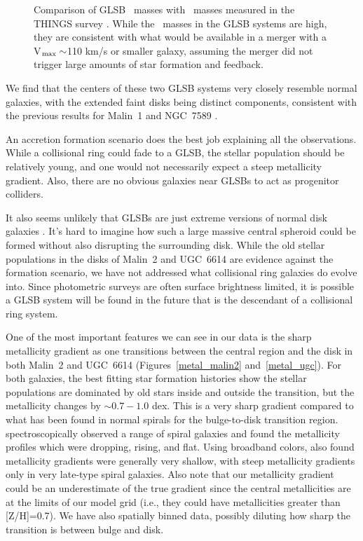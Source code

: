 \documentclass{emulateapj}
\newcommand\HI{\ion{H}{1}}
\begin{document}
\begin{figure*}
\caption{Comparison of GLSB \HI\ masses \citep{Pickering97} with \HI\ masses measured in the THINGS survey \citep{Walter2008}.  While the \HI\ masses in the GLSB systems are high, they are consistent with what would be available in a merger with a V$_{\rm{max}}\sim$110 km/s or smaller galaxy, assuming the merger did not trigger large amounts of star formation and feedback. \label{thingsMHI}}
\end{figure*}


We find that the centers of these two GLSB systems very closely resemble normal galaxies, with the extended faint disks being distinct components, consistent with the previous results for Malin~1 \citep{Barth07} and NGC~7589 \citep{Lelli10}. 

An accretion formation scenario does the best job explaining all the observations.  While a collisional ring could fade to a GLSB, the stellar population should be relatively young, and one would not necessarily expect a steep metallicity gradient.  Also, there are no obvious galaxies near GLSBs to act as progenitor colliders.  

It also seems unlikely that GLSBs are just extreme versions of normal disk galaxies \citep{Das13}.  It's hard to imagine how such a large massive central spheroid could be formed without also disrupting the surrounding disk.  While the old stellar populations in the disks of Malin~2 and UGC~6614 are evidence against the \citet{Mapelli08} formation scenario, we have not addressed what collisional ring galaxies do evolve into.  Since photometric surveys are often surface brightness limited, it is possible a GLSB system will be found in the future that is the descendant of a collisional ring system.  

One of the most important features we can see in our data is the sharp metallicity gradient as one transitions between the central region and the disk in both Malin~2 and UGC~6614 (Figures~\ref{metal_malin2} and~\ref{metal_ugc}).  For both galaxies, the best fitting star formation histories show the stellar populations are dominated by old stars inside and outside the transition, but the metallicity changes by $\sim0.7-1.0$ dex.  This is a very sharp gradient compared to what has been found in normal spirals for the bulge-to-disk transition region.  \citet{MacArthur09} spectroscopically observed a range of spiral galaxies and found the metallicity profiles which were dropping, rising, and flat.  Using broadband colors, \citet{MacArthur04} also found metallicity gradients were generally very shallow, with steep metallicity gradients only in very late-type spiral galaxies. Also note that our metallicity gradient could be an underestimate of the true gradient since the central metallicities are at the limits of our model grid (i.e., they could have metallicities greater than [Z/H]=0.7). We have also spatially binned data, possibly diluting how sharp the transition is between bulge and disk.
\end{document}

